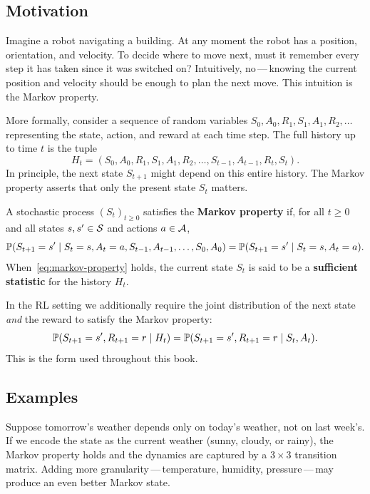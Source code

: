 \subsection*{Motivation}

Imagine a robot navigating a building. At any moment the robot has a position, orientation, and velocity. To decide where to move next, must it remember every step it has taken since it was switched on? Intuitively, no\,---\,knowing the current position and velocity should be enough to plan the next move. This intuition is the Markov property.

More formally, consider a sequence of random variables $S_0, A_0, R_1, S_1, A_1, R_2, \ldots$ representing the state, action, and reward at each time step. The full history up to time $t$ is the tuple
\[
H_t = (S_0, A_0, R_1, S_1, A_1, R_2, \ldots, S_{t-1}, A_{t-1}, R_t, S_t).
\]
In principle, the next state $S_{t+1}$ might depend on this entire history. The Markov property asserts that only the present state $S_t$ matters.

\begin{definition}
\label{def:markov-property}
A stochastic process $(S_t)_{t \ge 0}$ satisfies the \textbf{Markov property} if, for all $t \ge 0$ and all states $s, s' \in \mathcal{S}$ and actions $a \in \mathcal{A}$,
\begin{equation}
\label{eq:markov-property}
\mathbb{P}(S_{t+1} = s' \mid S_t = s, A_t = a, S_{t-1}, A_{t-1}, \ldots, S_0, A_0)
= \mathbb{P}(S_{t+1} = s' \mid S_t = s, A_t = a).
\end{equation}
When~\eqref{eq:markov-property} holds, the current state $S_t$ is said to be a \textbf{sufficient statistic} for the history $H_t$.
\end{definition}

\begin{remark}
In the RL setting we additionally require the joint distribution of the next state \emph{and} the reward to satisfy the Markov property:
\[
\mathbb{P}(S_{t+1} = s', R_{t+1} = r \mid H_t) = \mathbb{P}(S_{t+1} = s', R_{t+1} = r \mid S_t, A_t).
\]
This is the form used throughout this book.
\end{remark}

\subsection*{Examples}

\begin{example}
\label{ex:weather}
Suppose tomorrow's weather depends only on today's weather, not on last week's. If we encode the state as the current weather (sunny, cloudy, or rainy), the Markov property holds and the dynamics are captured by a $3 \times 3$ transition matrix. Adding more granularity\,---\,temperature, humidity, pressure\,---\,may produce an even better Markov state.
\end{example}

